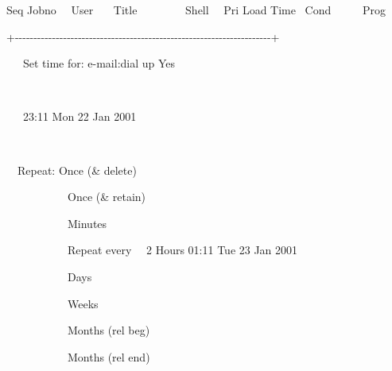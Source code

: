 \begin{exparasmall}

Seq Jobno \ \ User \ \ \ Title \ \ \ \ \ \ \ \ Shell \ \ Pri Load Time
\ Cond \ \ \ \ \ Prog

+-{}-{}-{}-{}-{}-{}-{}-{}-{}-{}-{}-{}-{}-{}-{}-{}-{}-{}-{}-{}-{}-{}-{}-{}-{}-{}-{}-{}-{}-{}-{}-{}-{}-{}-{}-{}-{}-{}-{}-{}-{}-{}-{}-{}-{}-{}-{}-{}-{}-{}-{}-{}-{}-{}-{}-{}-{}-{}-{}-{}-{}-{}-{}-{}-{}-{}-{}-{}-+

{\textbar} \ \ \ Set time for: e-mail:dial up Yes
\ \ \ \ \ \ \ \ \ \ \ \ \ \ \ \ \ \ \ \ \ \ \ \ \ \ \ \ \ \ \ {\textbar}

{\textbar}
\ \ \ \ \ \ \ \ \ \ \ \ \ \ \ \ \ \ \ \ \ \ \ \ \ \ \ \ \ \ \ \ \ \ \ \ \ \ \ \ \ \ \ \ \ \ \ \ \ \ \ \ \ \ \ \ \ \ \ \ \ \ \ \ \ \ \ \ {\textbar}

{\textbar} \ \ \ 23:11 Mon 22 Jan 2001
\ \ \ \ \ \ \ \ \ \ \ \ \ \ \ \ \ \ \ \ \ \ \ \ \ \ \ \ \ \ \ \ \ \ \ \ \ \ \ \ \ \ \ {\textbar}

{\textbar}
\ \ \ \ \ \ \ \ \ \ \ \ \ \ \ \ \ \ \ \ \ \ \ \ \ \ \ \ \ \ \ \ \ \ \ \ \ \ \ \ \ \ \ \ \ \ \ \ \ \ \ \ \ \ \ \ \ \ \ \ \ \ \ \ \ \ \ \ {\textbar}

{\textbar} \ \ Repeat: Once (\& delete)
\ \ \ \ \ \ \ \ \ \ \ \ \ \ \ \ \ \ \ \ \ \ \ \ \ \ \ \ \ \ \ \ \ \ \ \ \ \ \ \ \ {\textbar}

{\textbar} \ \ \ \ \ \ \ \ \ \ \ Once (\& retain)
\ \ \ \ \ \ \ \ \ \ \ \ \ \ \ \ \ \ \ \ \ \ \ \ \ \ \ \ \ \ \ \ \ \ \ \ \ \ \ \ \ {\textbar}

{\textbar} \ \ \ \ \ \ \ \ \ \ \ Minutes
\ \ \ \ \ \ \ \ \ \ \ \ \ \ \ \ \ \ \ \ \ \ \ \ \ \ \ \ \ \ \ \ \ \ \ \ \ \ \ \ \ \ \ \ \ \ \ \ \ {\textbar}

{\textbar} \ \ \ \ \ \ \ \ \ \ \ Repeat every \ \ 2 Hours 01:11 Tue 23
Jan 2001 \ \ \ \ \ \ \ \ \ \ \ \ {\textbar}

{\textbar} \ \ \ \ \ \ \ \ \ \ \ Days
\ \ \ \ \ \ \ \ \ \ \ \ \ \ \ \ \ \ \ \ \ \ \ \ \ \ \ \ \ \ \ \ \ \ \ \ \ \ \ \ \ \ \ \ \ \ \ \ \ \ \ \ {\textbar}

{\textbar} \ \ \ \ \ \ \ \ \ \ \ Weeks
\ \ \ \ \ \ \ \ \ \ \ \ \ \ \ \ \ \ \ \ \ \ \ \ \ \ \ \ \ \ \ \ \ \ \ \ \ \ \ \ \ \ \ \ \ \ \ \ \ \ \ {\textbar}

{\textbar} \ \ \ \ \ \ \ \ \ \ \ Months (rel beg)
\ \ \ \ \ \ \ \ \ \ \ \ \ \ \ \ \ \ \ \ \ \ \ \ \ \ \ \ \ \ \ \ \ \ \ \ \ \ \ \ {\textbar}

{\textbar} \ \ \ \ \ \ \ \ \ \ \ Months (rel end)
\ \ \ \ \ \ \ \ \ \ \ \ \ \ \ \ \ \ \ \ \ \ \ \ \ \ \ \ \ \ \ \ \ \ \ \ \ \ \ \ {\textbar}


\end{exparasmall}
